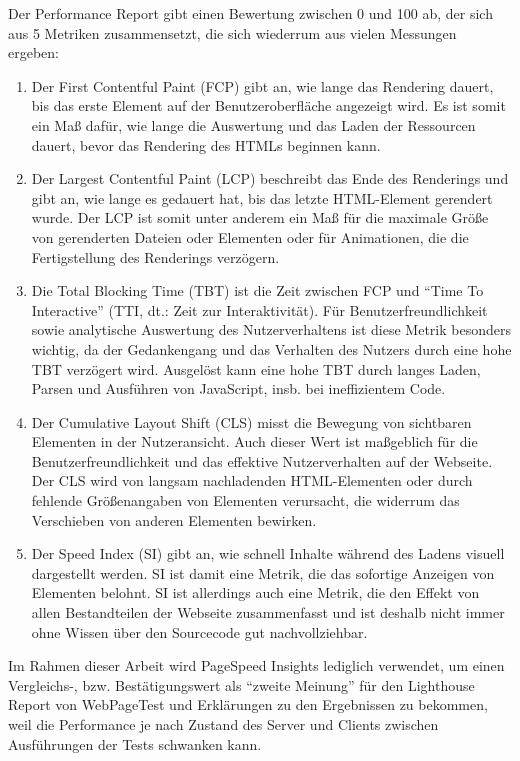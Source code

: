 \documentclass[11pt,a4paper]{article}
\begin{document}
Der Performance Report gibt einen Bewertung zwischen 0 und 100 ab, der sich aus 5 Metriken zusammensetzt, die sich wiederrum aus vielen Messungen ergeben:

\begin{enumerate}
  \item Der First Contentful Paint (FCP) gibt an, wie lange das Rendering dauert, bis das erste Element auf der Benutzeroberfläche angezeigt wird.
  Es ist somit ein Maß dafür, wie lange die Auswertung und das Laden der Ressourcen dauert, bevor das Rendering des HTMLs beginnen kann.
  \item Der Largest Contentful Paint (LCP) beschreibt das Ende des Renderings und gibt an, wie lange es gedauert hat, bis das letzte HTML-Element gerendert wurde.
  Der LCP ist somit unter anderem ein Maß für die maximale Größe von gerenderten Dateien oder Elementen oder für Animationen, die die Fertigstellung des Renderings verzögern.
  \item Die Total Blocking Time (TBT) ist die Zeit zwischen FCP und \enquote{Time To Interactive} (TTI, dt.: Zeit zur Interaktivität).
  Für Benutzerfreundlichkeit sowie analytische Auswertung des Nutzerverhaltens ist diese Metrik besonders wichtig, da der Gedankengang und das Verhalten des Nutzers durch eine hohe TBT verzögert wird.
  Ausgelöst kann eine hohe TBT durch langes Laden, Parsen und Ausführen von JavaScript, insb. bei ineffizientem Code.
  \item Der Cumulative Layout Shift (CLS) misst die Bewegung von sichtbaren Elementen in der Nutzeransicht. Auch dieser Wert ist maßgeblich für die Benutzerfreundlichkeit und das effektive Nutzerverhalten auf der Webseite.
  Der CLS wird von langsam nachladenden HTML-Elementen oder durch fehlende Größenangaben von Elementen verursacht, die widerrum das Verschieben von anderen Elementen bewirken.
  \item Der Speed Index (SI) gibt an, wie schnell Inhalte während des Ladens visuell dargestellt werden. SI ist damit eine Metrik, die das sofortige Anzeigen von Elementen belohnt.
  SI ist allerdings auch eine Metrik, die den Effekt von allen Bestandteilen der Webseite zusammenfasst und ist deshalb nicht immer ohne Wissen über den Sourcecode gut nachvollziehbar. 
\end{enumerate}

Im Rahmen dieser Arbeit wird PageSpeed Insights lediglich verwendet, um einen Vergleichs-, bzw. Bestätigungswert als \enquote{zweite Meinung} für den Lighthouse Report von WebPageTest und Erklärungen zu den Ergebnissen zu bekommen, weil die Performance je nach Zustand des Server und Clients zwischen Ausführungen der Tests schwanken kann.
\end{document}
